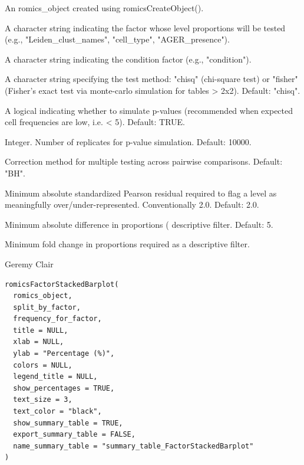 \documentclass[a4paper]{book}
\begin{document}
\begin{Arguments}
\begin{ldescription}
\item[\code{romics\_object}] An romics\_object created using romicsCreateObject().

\item[\code{test\_factor}] A character string indicating the factor whose level proportions
will be tested (e.g., "Leiden\_clust\_names", "cell\_type", "AGER\_presence").

\item[\code{condition\_factor}] A character string indicating the condition factor (e.g., "condition").

\item[\code{method}] A character string specifying the test method: "chisq" (chi-square test) or
"fisher" (Fisher's exact test via monte-carlo simulation for tables > 2x2). Default: "chisq".

\item[\code{simulate\_p}] A logical indicating whether to simulate p-values (recommended when expected
cell frequencies are low, i.e. < 5). Default: TRUE.

\item[\code{B}] Integer. Number of replicates for p-value simulation. Default: 10000.

\item[\code{padj\_method}] Correction method for multiple testing across pairwise comparisons. Default: "BH".

\item[\code{residual\_threshold}] Minimum absolute standardized Pearson residual required to flag a
level as meaningfully over/under-represented. Conventionally 2.0. Default: 2.0.

\item[\code{min\_effect\_size}] Minimum absolute difference in proportions (
descriptive filter. Default: 5.

\item[\code{min\_fold\_change}] Minimum fold change in proportions required as a descriptive filter.
\end{ldescription}
\end{Arguments}
%
\begin{Author}
Geremy Clair
\end{Author}
%
\begin{Usage}
\begin{verbatim}
romicsFactorStackedBarplot(
  romics_object,
  split_by_factor,
  frequency_for_factor,
  title = NULL,
  xlab = NULL,
  ylab = "Percentage (%)",
  colors = NULL,
  legend_title = NULL,
  show_percentages = TRUE,
  text_size = 3,
  text_color = "black",
  show_summary_table = TRUE,
  export_summary_table = FALSE,
  name_summary_table = "summary_table_FactorStackedBarplot"
)
\end{verbatim}
\end{Usage}
\end{document}
